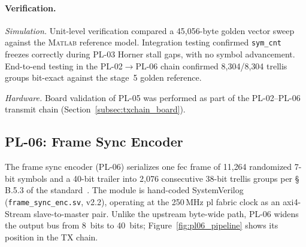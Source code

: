 
\FloatBarrier
\paragraph{Verification.}

\textit{Simulation.}
Unit-level verification compared a 45{,}056-byte golden vector sweep
against the \textsc{Matlab} reference model.
Integration testing confirmed \texttt{sym\_cnt} freezes correctly during
PL-03 Horner stall gaps, with no symbol advancement.
End-to-end testing in the PL-02$\to$PL-06 chain confirmed
8{,}304/8{,}304 trellis groups bit-exact against the stage~5 golden
reference.

\textit{Hardware.}
Board validation of PL-05 was performed as part of the PL-02--PL-06
transmit chain (Section~\ref{subsec:txchain_board}).

\clearpage


\subsection{PL-06: Frame Sync Encoder}
\label{subsec:pl06}


The frame sync encoder (PL-06) serializes one \ac{fec} frame of
11{,}264 randomized 7-bit symbols and a 40-bit trailer into
2{,}076 consecutive 38-bit trellis groups per \S\,B.5.3 of the
standard~\cite{ITU_J83}.
The module is hand-coded SystemVerilog (\texttt{frame\_sync\_enc.sv},
v2.2), operating at the 250\,MHz \ac{pl} fabric clock as an
\ac{axi}4-Stream slave-to-master pair.
Unlike the upstream byte-wide path, PL-06 widens the output bus from
8~bits to 40~bits; Figure~\ref{fig:pl06_pipeline} shows its position
in the TX chain.

